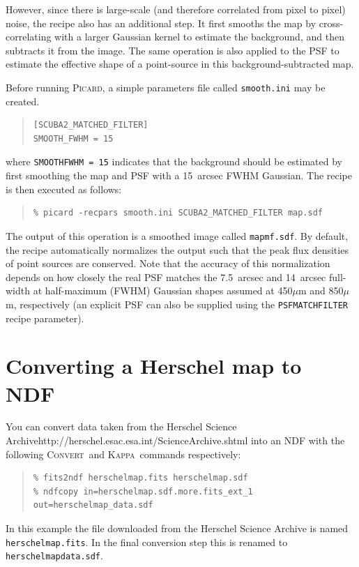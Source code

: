 \documentclass[twoside,11pt]{article}
\newcommand{\xref}[3]{#1}
\newcommand{\xlabel}[1]{}
\renewcommand{\_}{\texttt{\symbol{95}}}
\newenvironment{myquote}{\begin{quote}\begin{small}}{\end{small}\end{quote}}
\newcommand{\convert}{\xref{\textsc{Convert}}{sun55}{}}
\newcommand{\Kappa}{\xref{\textsc{Kappa}}{sun95}{}}
\newcommand{\param}[1]{\texttt{#1}}
\begin{document}
However, since there is large-scale (and therefore correlated from
pixel to pixel) noise, the recipe also has an additional step. It
first smooths the map by cross-correlating with a larger Gaussian
kernel to estimate the background, and then subtracts it from the
image. The same operation is also applied to the PSF to estimate the
effective shape of a point-source in this background-subtracted map.

Before running \textsc{Picard}, a simple parameters file called \texttt{smooth.ini}
may be created.
\begin{myquote}
\begin{verbatim}
[SCUBA2_MATCHED_FILTER]
SMOOTH_FWHM = 15
\end{verbatim}
\end{myquote}
%
where \texttt{SMOOTH\_FWHM = 15} indicates that the background should
be estimated by first smoothing the map and PSF with a 15~arcsec FWHM
Gaussian. The recipe is then executed as follows:
%
\begin{myquote}
\begin{verbatim}
% picard -recpars smooth.ini SCUBA2_MATCHED_FILTER map.sdf
\end{verbatim}
\end{myquote}
%
The output of this operation is a smoothed image called
\texttt{map\_mf.sdf}. By default, the recipe automatically normalizes
the output such that the peak flux densities of point sources are
conserved. Note that the accuracy of this normalization depends on how
closely the real PSF matches the 7.5~arcsec and 14~arcsec full-width
at half-maximum (FWHM) Gaussian shapes assumed at 450$\mu$m and
850$\mu$m, respectively (an explicit PSF can also be supplied using
the \param{PSF\_MATCHFILTER} recipe parameter).

\section{\xlabel{convert}Converting a Herschel map to NDF}
\label{app:convert}

You can convert data taken from the
{Herschel Science Archive}{http://herschel.esac.esa.int/Science\_Archive.shtml}
into an NDF with the following \convert\ and \Kappa\ commands respectively:

\begin{myquote}
\begin{verbatim}
% fits2ndf herschelmap.fits herschelmap.sdf
% ndfcopy in=herschelmap.sdf.more.fits_ext_1 out=herschelmap_data.sdf
\end{verbatim}
\end{myquote}
In this example the file downloaded from the Herschel Science Archive
is named \texttt{herschelmap.fits}. In the final conversion step this
is renamed to \texttt{herschelmap\_data.sdf}.
\end{document}
